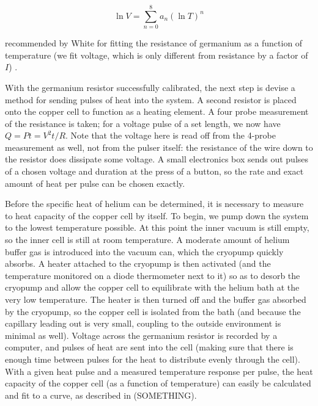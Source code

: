 \begin{equation}
\label{eq:fiteqn}
\ln{V} = \sum_{n=0}^{8} a_{n} (\ln{T})^{n}
\end{equation}

recommended by White for fitting the resistance of germanium as a function of temperature (we fit voltage, which is only different from resistance by a factor of $I$) \cite[p.~140]{white}.

With the germanium resistor successfully calibrated, the next step is devise a method for sending pulses of heat into the system. A second resistor is placed onto the copper cell to function as a heating element. A four probe measurement of the resistance is taken; for a voltage pulse of a set length, we now have $Q = P t = V^{2} t / R$. Note that the voltage here is read off from the 4-probe measurement as well, not from the pulser itself: the resistance of the wire down to the resistor does dissipate some voltage. A small electronics box sends out pulses of a chosen voltage and duration at the press of a button, so the rate and exact amount of heat per pulse can be chosen exactly.

Before the specific heat of helium can be determined, it is necessary to measure to heat capacity of the copper cell by itself. To begin, we pump down the system to the lowest temperature possible. At this point the inner vacuum is still empty, so the inner cell is still at room temperature. A moderate amount of helium buffer gas is introduced into the vacuum can, which the cryopump quickly absorbs. A heater attached to the cryopump is then activated (and the temperature monitored on a diode thermometer next to it) so as to desorb the cryopump and allow the copper cell to equilibrate with the helium bath at the very low temperature. The heater is then turned off and the buffer gas absorbed by the cryopump, so the copper cell is isolated from the bath (and because the capillary leading out is very small, coupling to the outside environment is minimal as well). Voltage across the germanium resistor is recorded by a computer, and pulses of heat are sent into the cell (making sure that there is enough time between pulses for the heat to distribute evenly through the cell). With a given heat pulse and a measured temperature response per pulse, the heat capacity of the copper cell (as a function of temperature) can easily be calculated and fit to a curve, as described in (SOMETHING).


